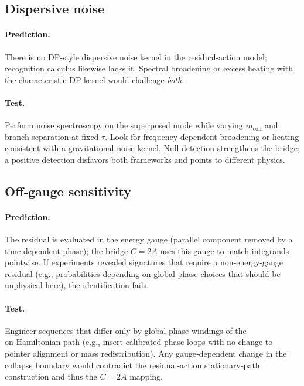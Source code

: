 \documentclass[11pt,letterpaper]{article}
\begin{document}
\subsection{Dispersive noise}

\paragraph{Prediction.}
There is no DP‑style dispersive noise kernel in the residual‑action model; recognition calculus likewise lacks it. Spectral broadening or excess heating with the characteristic DP kernel would challenge \emph{both}. %

\paragraph{Test.}
Perform noise spectroscopy on the superposed mode while varying $m_{\mathrm{coh}}$ and branch separation at fixed $\tau$. Look for frequency‑dependent broadening or heating consistent with a gravitational noise kernel. Null detection strengthens the bridge; a positive detection disfavors both frameworks and points to different physics.

\subsection{Off‑gauge sensitivity}

\paragraph{Prediction.}
The residual is evaluated in the energy gauge (parallel component removed by a time‑dependent phase); the bridge \(C=2A\) uses this gauge to match integrands pointwise. If experiments revealed signatures that require a non‑energy‑gauge residual (e.g., probabilities depending on global phase choices that should be unphysical here), the identification fails. %

\paragraph{Test.}
Engineer sequences that differ only by global phase windings of the on‑Hamiltonian path (e.g., insert calibrated phase loops with no change to pointer alignment or mass redistribution). Any gauge‑dependent change in the collapse boundary would contradict the residual‑action stationary‑path construction and thus the $C=2A$ mapping.
\end{document}
